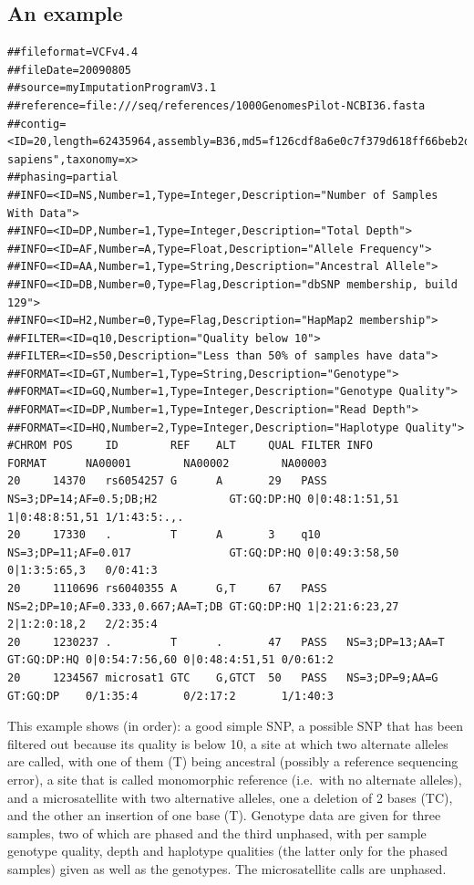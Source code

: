 \documentclass[8pt]{article}
\begin{document}
\subsection{An example}
\scriptsize
\begin{verbatim}
##fileformat=VCFv4.4
##fileDate=20090805
##source=myImputationProgramV3.1
##reference=file:///seq/references/1000GenomesPilot-NCBI36.fasta
##contig=<ID=20,length=62435964,assembly=B36,md5=f126cdf8a6e0c7f379d618ff66beb2da,species="Homo sapiens",taxonomy=x>
##phasing=partial
##INFO=<ID=NS,Number=1,Type=Integer,Description="Number of Samples With Data">
##INFO=<ID=DP,Number=1,Type=Integer,Description="Total Depth">
##INFO=<ID=AF,Number=A,Type=Float,Description="Allele Frequency">
##INFO=<ID=AA,Number=1,Type=String,Description="Ancestral Allele">
##INFO=<ID=DB,Number=0,Type=Flag,Description="dbSNP membership, build 129">
##INFO=<ID=H2,Number=0,Type=Flag,Description="HapMap2 membership">
##FILTER=<ID=q10,Description="Quality below 10">
##FILTER=<ID=s50,Description="Less than 50% of samples have data">
##FORMAT=<ID=GT,Number=1,Type=String,Description="Genotype">
##FORMAT=<ID=GQ,Number=1,Type=Integer,Description="Genotype Quality">
##FORMAT=<ID=DP,Number=1,Type=Integer,Description="Read Depth">
##FORMAT=<ID=HQ,Number=2,Type=Integer,Description="Haplotype Quality">
#CHROM POS     ID        REF    ALT     QUAL FILTER INFO                              FORMAT      NA00001        NA00002        NA00003
20     14370   rs6054257 G      A       29   PASS   NS=3;DP=14;AF=0.5;DB;H2           GT:GQ:DP:HQ 0|0:48:1:51,51 1|0:48:8:51,51 1/1:43:5:.,.
20     17330   .         T      A       3    q10    NS=3;DP=11;AF=0.017               GT:GQ:DP:HQ 0|0:49:3:58,50 0|1:3:5:65,3   0/0:41:3
20     1110696 rs6040355 A      G,T     67   PASS   NS=2;DP=10;AF=0.333,0.667;AA=T;DB GT:GQ:DP:HQ 1|2:21:6:23,27 2|1:2:0:18,2   2/2:35:4
20     1230237 .         T      .       47   PASS   NS=3;DP=13;AA=T                   GT:GQ:DP:HQ 0|0:54:7:56,60 0|0:48:4:51,51 0/0:61:2
20     1234567 microsat1 GTC    G,GTCT  50   PASS   NS=3;DP=9;AA=G                    GT:GQ:DP    0/1:35:4       0/2:17:2       1/1:40:3
\end{verbatim}
\normalsize
This example shows (in order): a good simple SNP, a possible SNP that has been filtered out because its quality is below 10, a site at which two alternate alleles are called, with one of them (T) being ancestral (possibly a reference sequencing error), a site that is called monomorphic reference (i.e.\ with no alternate alleles), and a microsatellite with two alternative alleles, one a deletion of 2 bases (TC), and the other an insertion of one base (T).
Genotype data are given for three samples, two of which are phased and the third unphased, with per sample genotype quality, depth and haplotype qualities (the latter only for the phased samples) given as well as the genotypes.
The microsatellite calls are unphased.
\end{document}
